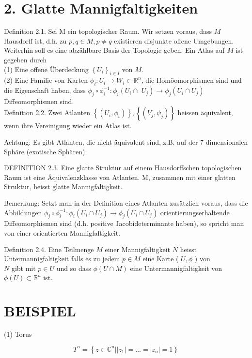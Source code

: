 \documentclass[10pt, letterpaper]{article}
\begin{document}
\section*{2. Glatte Mannigfaltigkeiten}
Definition 2.1. Sei M ein topologischer Raum. Wir setzen voraus, dass $M$ Hausdorff ist, d.h. zu $p, q \in M, p \neq q$ existieren disjunkte offene Umgebungen. Weiterhin soll es eine abzählbare Basis der Topologie geben. Ein Atlas auf $M$ ist gegeben durch\\
(1) Eine offene Überdeckung $\left\{U_{i}\right\}_{i \in I}$ von $M$.\\
(2) Eine Familie von Karten $\phi_{i}: U_{i} \rightarrow W_{i} \subset \mathbb{R}^{n}$, die Homöomorphismen sind und die Eigenschaft haben, dass $\phi_{j} \circ \phi_{i}^{-1}: \phi_{i}\left(U_{i} \cap\right.$ $\left.U_{j}\right) \rightarrow \phi_{j}\left(U_{i} \cap U_{j}\right)$ Diffeomorphismen sind.\\
Definition 2.2. Zwei Atlanten $\left\{\left(U_{i}, \phi_{i}\right)\right\},\left\{\left(V_{j}, \psi_{j}\right)\right\}$ heissen äquivalent, wenn ihre Vereinigung wieder ein Atlas ist.

Achtung: Es gibt Atlanten, die nicht äquivalent sind, z.B. auf der 7-dimensionalen Sphäre (exotische Sphären).

DEFINITION 2.3. Eine glatte Struktur auf einem Hausdorffschen topologischen Raum ist eine Äquivalenzklasse von Atlanten. M, zusammen mit einer glatten Struktur, heisst glatte Mannigfaltigkeit.

Bemerkung: Setzt man in der Definition eines Atlanten zusätzlich voraus, dass die Abbildungen $\phi_{j} \circ \phi_{i}^{-1}: \phi_{i}\left(U_{i} \cap U_{j}\right) \rightarrow \phi_{j}\left(U_{i} \cap U_{j}\right)$ orientierungserhaltende Diffeomorphismen sind (d.h. positive Jacobideterminante haben), so spricht man von einer orientierten Mannigfaltigkeit.

Definition 2.4. Eine Teilmenge $M$ einer Mannigfaltigkeit $N$ heisst Untermannigfaltigkeit falls es zu jedem $p \in M$ eine Karte ( $U, \phi$ ) von\\
$N$ gibt mit $p \in U$ und so dass $\phi(U \cap M)$ eine Untermannigfaltigkeit von $\phi(U) \subset \mathbb{R}^{n}$ ist.

\section*{BEISPIEL}
(1) Torus

$$
T^{n}=\left\{z \in \mathbb{C}^{n}| | z_{1}\left|=\ldots=\left|z_{n}\right|=1\right\}\right.
$$
\end{document}
